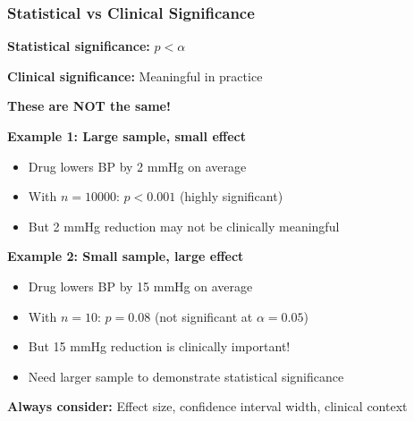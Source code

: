 \documentclass{beamer}
\begin{document}
\begin{frame}
\frametitle{Statistical vs Clinical Significance}
\textbf{Statistical significance:} $p < \alpha$

\textbf{Clinical significance:} Meaningful in practice

\vspace{0.3cm}
\textbf{These are NOT the same!}

\vspace{0.3cm}
\textbf{Example 1: Large sample, small effect}
\begin{itemize}
\item Drug lowers BP by 2 mmHg on average
\item With $n = 10000$: $p < 0.001$ (highly significant)
\item But 2 mmHg reduction may not be clinically meaningful
\end{itemize}

\vspace{0.3cm}
\textbf{Example 2: Small sample, large effect}
\begin{itemize}
\item Drug lowers BP by 15 mmHg on average
\item With $n = 10$: $p = 0.08$ (not significant at $\alpha = 0.05$)
\item But 15 mmHg reduction is clinically important!
\item Need larger sample to demonstrate statistical significance
\end{itemize}

\vspace{0.3cm}
\textbf{Always consider:} Effect size, confidence interval width, clinical context
\end{frame}
\end{document}
